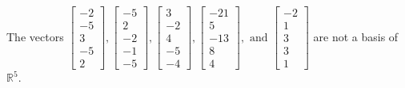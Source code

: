 \begin{exercise}
\begin{exerciseStatement}
  \end{exerciseStatement}
  \begin{exerciseAnswer}
   The vectors \(\left[\begin{array}{r}
-2 \\
-5 \\
3 \\
-5 \\
2
\end{array}\right] , \left[\begin{array}{r}
-5 \\
2 \\
-2 \\
-1 \\
-5
\end{array}\right] , \left[\begin{array}{r}
3 \\
-2 \\
4 \\
-5 \\
-4
\end{array}\right] , \left[\begin{array}{r}
-21 \\
5 \\
-13 \\
8 \\
4
\end{array}\right] , \text{ and } \left[\begin{array}{r}
-2 \\
1 \\
3 \\
3 \\
1
\end{array}\right]\) 
  	 are not  a basis of \(\mathbb{R}^5\).
  


  \end{exerciseAnswer}
\end{exercise}